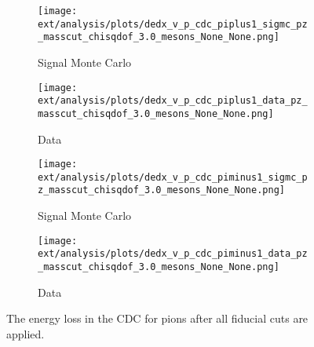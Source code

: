 \begin{figure}
    \centering
    \begin{subfigure}{0.45\textwidth}
        \texttt{[image: ext/analysis/plots/dedx\_v\_p\_cdc\_piplus1\_sigmc\_pz\_masscut\_chisqdof\_3.0\_mesons\_None\_None.png]}
        \caption{Signal Monte Carlo}
    \end{subfigure}
    \hfill
    \begin{subfigure}{0.45\textwidth}
        \texttt{[image: ext/analysis/plots/dedx\_v\_p\_cdc\_piplus1\_data\_pz\_masscut\_chisqdof\_3.0\_mesons\_None\_None.png]}
        \caption{Data}
    \end{subfigure}
    \vspace{1em}
    \begin{subfigure}{0.45\textwidth}
        \texttt{[image: ext/analysis/plots/dedx\_v\_p\_cdc\_piminus1\_sigmc\_pz\_masscut\_chisqdof\_3.0\_mesons\_None\_None.png]}
        \caption{Signal Monte Carlo}
    \end{subfigure}
    \hfill
    \begin{subfigure}{0.45\textwidth}
        \texttt{[image: ext/analysis/plots/dedx\_v\_p\_cdc\_piminus1\_data\_pz\_masscut\_chisqdof\_3.0\_mesons\_None\_None.png]}
        \caption{Data}
    \end{subfigure}
    \caption{The energy loss in the CDC for pions after all fiducial cuts are applied.}\label{fig:dedx-v-p-cdc-pions-pz-masscut-chisqdof-3.0-mesons}
\end{figure}

